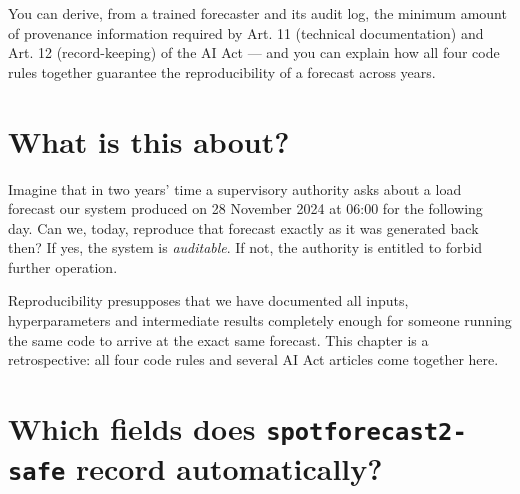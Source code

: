 \documentclass[
  english,
  letterpaper,
]{scrbook}
\begin{document}
\begin{tcolorbox}[enhanced jigsaw, arc=.35mm, bottomrule=.15mm, bottomtitle=1mm, breakable, colback=white, colbacktitle=quarto-callout-note-color!10!white, colframe=quarto-callout-note-color-frame, coltitle=black, left=2mm, leftrule=.75mm, opacityback=0, opacitybacktitle=0.6, rightrule=.15mm, title=\textcolor{quarto-callout-note-color}{\faInfo}\hspace{0.5em}{Learning objective}, titlerule=0mm, toprule=.15mm, toptitle=1mm]

You can derive, from a trained forecaster and its audit log, the minimum
amount of provenance information required by Art. 11 (technical
documentation) and Art. 12 (record-keeping) of the AI Act --- and you
can explain how all four code rules together guarantee the
reproducibility of a forecast across years.

\end{tcolorbox}

\section{What is this about?}\label{what-is-this-about}

Imagine that in two years' time a supervisory authority asks about a
load forecast our system produced on 28 November 2024 at 06:00 for the
following day. Can we, today, reproduce that forecast exactly as it was
generated back then? If yes, the system is \emph{auditable}. If not, the
authority is entitled to forbid further operation.

Reproducibility presupposes that we have documented all inputs,
hyperparameters and intermediate results completely enough for someone
running the same code to arrive at the exact same forecast. This chapter
is a retrospective: all four code rules and several AI Act articles come
together here.

\section{\texorpdfstring{Which fields does \texttt{spotforecast2-safe}
record
automatically?}{Which fields does spotforecast2-safe record automatically?}}\label{which-fields-does-spotforecast2-safe-record-automatically}
\end{document}
